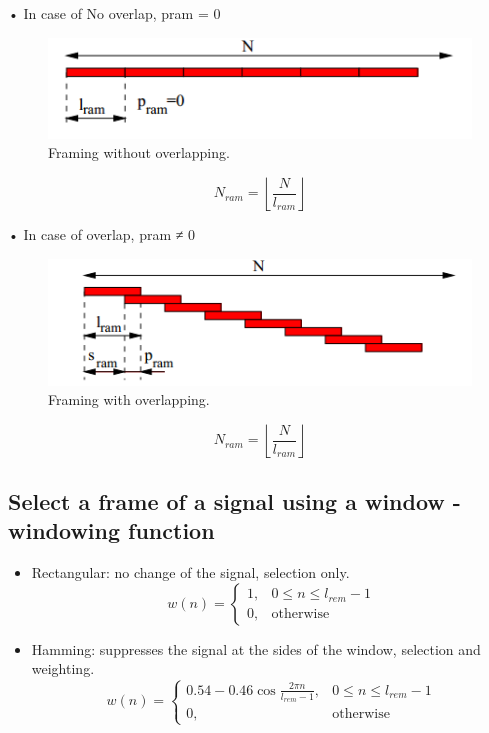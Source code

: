 \documentclass[12pt, a4paper, twoside]{report}
\begin{document}
• In case of No overlap, pram = 0

\begin{figure}[ht]
	\centering
	\includegraphics[width=1\textwidth]
	{images/chapter2/frame-wo-overlap}
	\caption{Framing without overlapping.}
	\label{fig:frame-wo-overlap}
\end{figure}

\begin{equation*}
N_{ram} = \left \lfloor \frac{N}{l_{ram}} \right \rfloor
\end{equation*}

• In case of overlap, pram ≠ 0

\begin{figure}[ht]
	\centering
	\includegraphics[width=1\textwidth]
	{images/chapter2/frame-overlap}
	\caption{Framing with overlapping.}
	\label{fig:frame-overlap}
\end{figure}

\begin{equation*}
N_{ram} = \left \lfloor \frac{N}{l_{ram}} \right \rfloor
\end{equation*}

\subsection{Select a frame of a signal using a window - windowing function}
\begin{itemize}
\item Rectangular: no change of the signal, selection only.
\begin{equation*}
w(n) =
\begin{cases}
1, & 0 \leq n \leq l_{rem} -1 \\
0, & \text{otherwise}
\end{cases}
\end{equation*}
\item Hamming: suppresses the signal at the sides of the window, selection and weighting.
\begin{equation*}
w(n) =
\begin{cases}
0.54 - 0.46 \cos \frac{2 \pi n}{l_{rem} - 1}, & 0 \leq n \leq l_{rem} -1 \\
0, & \text{otherwise}
\end{cases}
\end{equation*}
\end{itemize}
\end{document}
